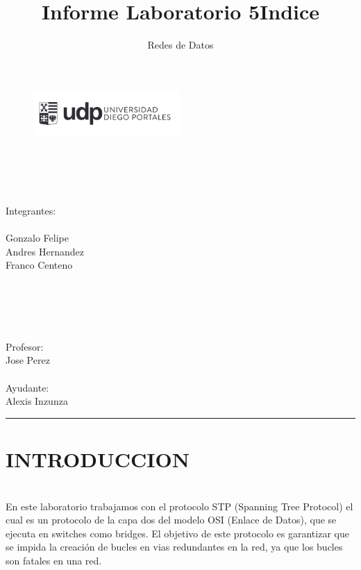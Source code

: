 \documentclass[onecolumn,12pt]{IEEEtran}
\begin{document}
\title{Informe Laboratorio 5}
\author{Redes de Datos}

\begin{figure}[h]
\includegraphics[width=0.50\textwidth]{logo_udp.png}
\label{fig:mesh1}
\\
\\
\\
\\
\\
\maketitle
\end{figure}
\begin{center}
Integrantes:\\
\hfill \\
Gonzalo Felipe\\
Andres Hernandez\\
Franco Centeno\\
\hfill \\
\hfill \\
\hfill \\
\hfill \\
\ \hfill \\
Profesor:\\
Jose Perez\\ \hfill \\
Ayudante:\\
Alexis Inzunza\\
\end{center}

\newpage
\title{Indice}
\author{ }
\maketitle
\hrule
\tableofcontents

\newpage
\section{INTRODUCCION}
\hfill \\

En este laboratorio trabajamos con el protocolo STP (Spanning Tree Protocol) el cual es un protocolo de la capa dos del modelo OSI (Enlace de Datos), que se ejecuta en switches como bridges. El objetivo de este protocolo es garantizar que se impida la creación de bucles en vias redundantes en la red, ya que los bucles son fatales en una red.
\end{document}
